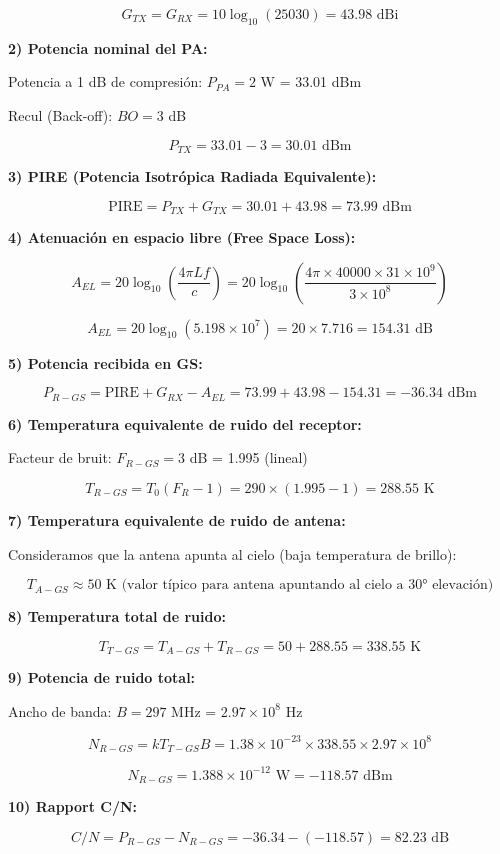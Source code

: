 \documentclass[12pt,a4paper]{extarticle}
\begin{document}
$$G_{TX} = G_{RX} = 10 \log_{10}(25030) = 43.98 \text{ dBi}$$

\textbf{2) Potencia nominal del PA:}

Potencia a 1 dB de compresión: $P_{PA} = 2$ W = 33.01 dBm

Recul (Back-off): $BO = 3$ dB

$$P_{TX} = 33.01 - 3 = 30.01 \text{ dBm}$$

\textbf{3) PIRE (Potencia Isotrópica Radiada Equivalente):}

$$\text{PIRE} = P_{TX} + G_{TX} = 30.01 + 43.98 = 73.99 \text{ dBm}$$

\textbf{4) Atenuación en espacio libre (Free Space Loss):}

$$A_{EL} = 20 \log_{10}\left(\frac{4\pi L f}{c}\right) = 20 \log_{10}\left(\frac{4\pi \times 40000 \times 31 \times 10^9}{3 \times 10^8}\right)$$

$$A_{EL} = 20 \log_{10}(5.198 \times 10^7) = 20 \times 7.716 = 154.31 \text{ dB}$$

\textbf{5) Potencia recibida en GS:}

$$P_{R-GS} = \text{PIRE} + G_{RX} - A_{EL} = 73.99 + 43.98 - 154.31 = -36.34 \text{ dBm}$$

\textbf{6) Temperatura equivalente de ruido del receptor:}

Facteur de bruit: $F_{R-GS} = 3$ dB = 1.995 (lineal)

$$T_{R-GS} = T_0 (F_R - 1) = 290 \times (1.995 - 1) = 288.55 \text{ K}$$

\textbf{7) Temperatura equivalente de ruido de antena:}

Consideramos que la antena apunta al cielo (baja temperatura de brillo):

$$T_{A-GS} \approx 50 \text{ K (valor típico para antena apuntando al cielo a 30° elevación)}$$

\textbf{8) Temperatura total de ruido:}

$$T_{T-GS} = T_{A-GS} + T_{R-GS} = 50 + 288.55 = 338.55 \text{ K}$$

\textbf{9) Potencia de ruido total:}

Ancho de banda: $B = 297$ MHz = $2.97 \times 10^8$ Hz

$$N_{R-GS} = k T_{T-GS} B = 1.38 \times 10^{-23} \times 338.55 \times 2.97 \times 10^8$$

$$N_{R-GS} = 1.388 \times 10^{-12} \text{ W} = -118.57 \text{ dBm}$$

\textbf{10) Rapport C/N:}

$$C/N = P_{R-GS} - N_{R-GS} = -36.34 - (-118.57) = 82.23 \text{ dB}$$
\end{document}
